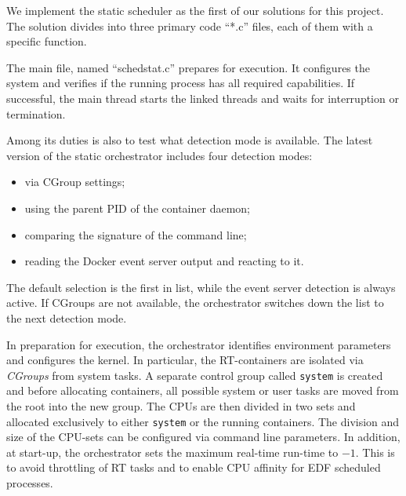 \documentclass[]{scrartcl}
\begin{document}
We implement the static scheduler as the first of our solutions for this project. 
The solution divides into three primary code ``*.c'' files, each of them with a specific function. 

The main file, named ``schedstat.c'' prepares for execution.
It configures the system and verifies if the running process has all required capabilities. 
If successful, the main thread starts the linked threads and waits for interruption or termination.

Among its duties is also to test what detection mode is available.
The latest version of the static orchestrator includes four detection modes:
\begin{itemize}
	\item via CGroup settings;
	\item using the parent PID of the container daemon;
	\item comparing the signature of the command line;
	\item reading the Docker event server output and reacting to it.
\end{itemize}
The default selection is the first in list, while the event server detection is always active. If CGroups are not available, the orchestrator switches down the list to the next detection mode.

In preparation for execution, the orchestrator identifies environment parameters and configures the kernel.
In particular, the RT-containers are isolated via \emph{CGroups} from system tasks.
A separate control group called \texttt{system} is created and before allocating containers, all possible system or user tasks are moved from the root into the new group.
The CPUs are then divided in two sets and allocated exclusively to either \texttt{system} or the running containers.
The division and size of the CPU-sets can be configured via command line parameters.
In addition, at start-up, the orchestrator sets the maximum real-time run-time to $-1$. This is to avoid throttling of RT tasks and to enable CPU affinity for EDF scheduled processes.
\end{document}

